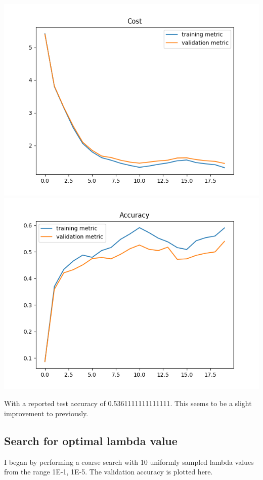 \documentclass[11pt,a4paper]{article}
\begin{document}
\includegraphics[width=\textwidth]{cost_k=2_batch_norm.png}
\includegraphics[width=\textwidth]{accuracy_k=2_batch_norm.png}

With a reported test accuracy of 0.5361111111111111. This seems to be a slight improvement to previously.

\subsection{Search for optimal lambda value}

I began by performing a coarse search with 10 uniformly sampled lambda values from the range 1E-1, 1E-5. The validation accuracy is plotted here.
\end{document}
